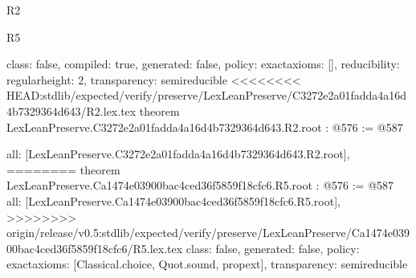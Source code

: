 \begin{lexlean}{R2}
\begin{lexlean}{R5}
\begin{coremodule}
{{{{{  class: false,
  compiled: true,
  generated: false,
  policy: exact{axioms: []},
  reducibility: regular{height: 2},
  transparency: semireducible
}
<<<<<<<< HEAD:stdlib/expected/verify/preserve/LexLeanPreserve/C3272e2a01fadda4a16d4b7329364d643/R2.lex.tex
theorem LexLeanPreserve.C3272e2a01fadda4a16d4b7329364d643.R2.root : @576 := @587 {
  all: [LexLeanPreserve.C3272e2a01fadda4a16d4b7329364d643.R2.root],
========
theorem LexLeanPreserve.Ca1474e03900bac4ced36f5859f18cfc6.R5.root : @576 := @587 {
  all: [LexLeanPreserve.Ca1474e03900bac4ced36f5859f18cfc6.R5.root],
>>>>>>>> origin/release/v0.5:stdlib/expected/verify/preserve/LexLeanPreserve/Ca1474e03900bac4ced36f5859f18cfc6/R5.lex.tex
  class: false,
  generated: false,
  policy: exact{axioms: [Classical.choice, Quot.sound, propext]},
  transparency: semireducible
}

}}}}}
\end{coremodule}
\end{lexlean}
\end{lexlean}
